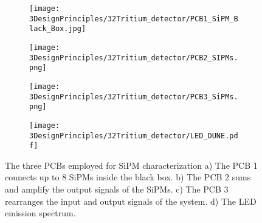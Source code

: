 \begin{figure}
\centering
    \begin{subfigure}[b]{0.5\textwidth}
    \centering
    \texttt{[image: 3DesignPrinciples/32Tritium\_detector/PCB1\_SiPM\_Black\_Box.jpg]}  
    \caption{\label{subfig:PCB1}}
    \end{subfigure}
    \hfill
    \begin{subfigure}[b]{0.45\textwidth}
    \centering
    \texttt{[image: 3DesignPrinciples/32Tritium\_detector/PCB2\_SIPMs.png]}  
    \caption{\label{subfig:PCB2}}
    \end{subfigure}
    \hfill
    \begin{subfigure}[b]{0.4\textwidth}
    \centering
    \texttt{[image: 3DesignPrinciples/32Tritium\_detector/PCB3\_SiPMs.png]}  
    \caption{\label{subfig:PCB3}}
    \end{subfigure}
    \hfill
    \begin{subfigure}[b]{0.5\textwidth}
    \centering
    \texttt{[image: 3DesignPrinciples/32Tritium\_detector/LED\_DUNE.pdf]}  
    \caption{\label{subfig:LEDSpectrum}}
    \end{subfigure}
 \caption{The three PCBs employed for SiPM characterization a) The PCB 1 connects up to 8 SiPMs inside the black box. b) The PCB 2 sums and amplify the output signals of the SiPMs. c) The PCB 3 rearranges the input and output signals of the system. d) The LED emission spectrum.}
 \label{fig:PCBs_LEDSpectrum}
\end{figure}